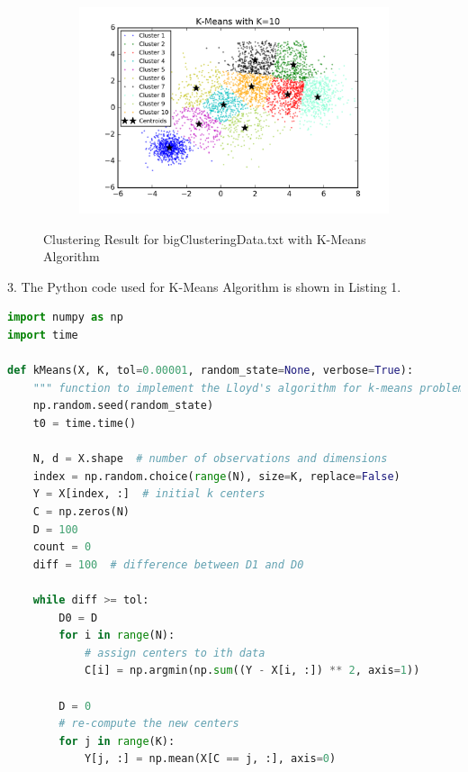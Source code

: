 \begin{description}
\begin{description}
\begin{figure}[!h]
\begin{subfigure}[b]{0.475\textwidth}
            \includegraphics[width=\textwidth]{./figures/bigClustering_kMeans_10.png}
        \end{subfigure}
        
        \caption{Clustering Result for bigClusteringData.txt with K-Means Algorithm}
        \label{fig:kmean_bigCustering}
\end{figure}

\newpage
\item{3.} The Python code used for K-Means Algorithm is shown in Listing 1.

\begin{lstlisting}[language=Python, caption={K-Means Algorithm Python Code}]
import numpy as np
import time

def kMeans(X, K, tol=0.00001, random_state=None, verbose=True):
    """ function to implement the Lloyd's algorithm for k-means problem """
    np.random.seed(random_state)
    t0 = time.time()

    N, d = X.shape  # number of observations and dimensions
    index = np.random.choice(range(N), size=K, replace=False)
    Y = X[index, :]  # initial k centers
    C = np.zeros(N)
    D = 100
    count = 0
    diff = 100  # difference between D1 and D0

    while diff >= tol:
        D0 = D
        for i in range(N):
            # assign centers to ith data
            C[i] = np.argmin(np.sum((Y - X[i, :]) ** 2, axis=1))

        D = 0
        # re-compute the new centers
        for j in range(K):
            Y[j, :] = np.mean(X[C == j, :], axis=0)


\end{lstlisting}
\end{description}
\end{description}
